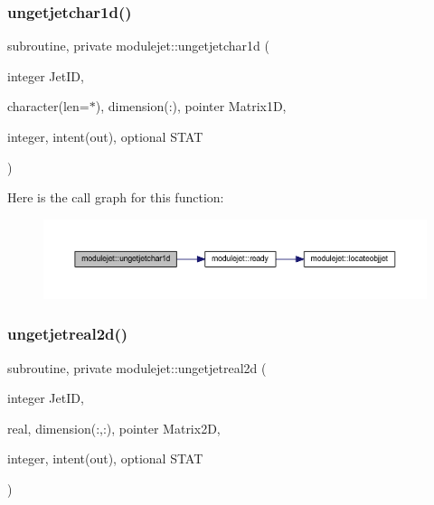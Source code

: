 \subsubsection{\texorpdfstring{ungetjetchar1d()}{ungetjetchar1d()}}
{\footnotesize\ttfamily subroutine, private modulejet\+::ungetjetchar1d (\begin{DoxyParamCaption}\item[{integer}]{Jet\+ID,  }\item[{character(len=$\ast$), dimension(\+:), pointer}]{Matrix1D,  }\item[{integer, intent(out), optional}]{S\+T\+AT }\end{DoxyParamCaption})\hspace{0.3cm}{\ttfamily [private]}}

Here is the call graph for this function\+:\nopagebreak
\begin{figure}[H]
\begin{center}
\leavevmode
\includegraphics[width=350pt]{namespacemodulejet_aaa0ceb23e085072c0cf5693f217b27ea_cgraph}
\end{center}
\end{figure}
\mbox{\label{namespacemodulejet_a3faa436f5c17dc03c594506d8e2e37ac}} 
\subsubsection{\texorpdfstring{ungetjetreal2d()}{ungetjetreal2d()}}
{\footnotesize\ttfamily subroutine, private modulejet\+::ungetjetreal2d (\begin{DoxyParamCaption}\item[{integer}]{Jet\+ID,  }\item[{real, dimension(\+:,\+:), pointer}]{Matrix2D,  }\item[{integer, intent(out), optional}]{S\+T\+AT }\end{DoxyParamCaption})\hspace{0.3cm}{\ttfamily [private]}}

